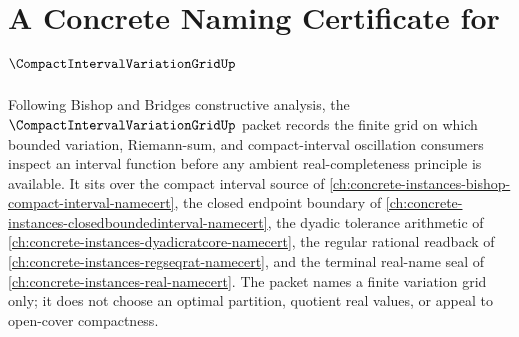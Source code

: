 \chapter{A Concrete Naming Certificate for $\CompactIntervalVariationGridUp$}
\label{ch:concrete-instances-compact-interval-variation-grid-namecert}

Following Bishop and Bridges constructive analysis, the $\CompactIntervalVariationGridUp$ packet records the finite grid on which bounded variation, Riemann-sum, and compact-interval oscillation consumers inspect an interval function before any ambient real-completeness principle is available. It sits over the compact interval source of \autoref{ch:concrete-instances-bishop-compact-interval-namecert}, the closed endpoint boundary of \autoref{ch:concrete-instances-closedboundedinterval-namecert}, the dyadic tolerance arithmetic of \autoref{ch:concrete-instances-dyadicratcore-namecert}, the regular rational readback of \autoref{ch:concrete-instances-regseqrat-namecert}, and the terminal real-name seal of \autoref{ch:concrete-instances-real-namecert}. The packet names a finite variation grid only; it does not choose an optimal partition, quotient real values, or appeal to open-cover compactness.

